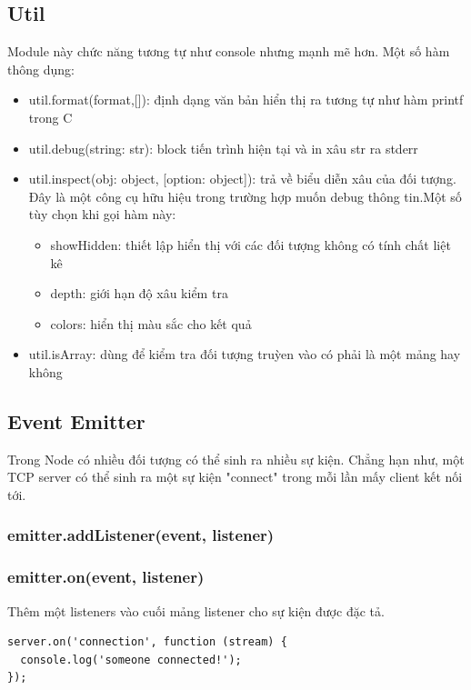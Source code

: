 	\subsection{Util}
		Module này chức năng tương tự như console nhưng mạnh mẽ hơn. Một số hàm thông dụng:
		\begin{itemize}
			\item util.format(format,[]): định dạng văn bản hiển thị ra tương tự như hàm printf trong C
			\item util.debug(string: str): block tiến trình hiện tại và in xâu str ra stderr
			\item util.inspect(obj: object, [option: object]): 	 trả về biểu diễn xâu của đối tượng. Đây là một công cụ hữu hiệu trong trường hợp muốn debug thông tin.Một số tùy chọn khi gọi hàm này:
			
			\begin{itemize}
				\item showHidden: thiết lập hiển thị với các đối tượng không có tính chất liệt kê
				\item depth: giới hạn độ xâu kiểm tra
				\item colors: hiển thị màu sắc cho kết quả
			\end{itemize}
			
			\item util.isArray:  dùng để kiểm tra đối tượng truỳen vào có phải là một mảng hay không		
		\end{itemize}

	\subsection{Event Emitter}
	Trong Node có nhiều đối tượng có thể sinh ra nhiều sự kiện. Chẳng hạn như, một TCP server có thể sinh ra  một sự kiện "connect" trong mỗi lần mấy client kết nối tới. 
		\subsubsection{emitter.addListener(event, listener)}
		\subsubsection{emitter.on(event, listener)}
Thêm một listeners vào cuối mảng listener cho sự kiện được đặc tả.
			\begin{verbatim}
server.on('connection', function (stream) {
  console.log('someone connected!');
});
			\end{verbatim}
			

